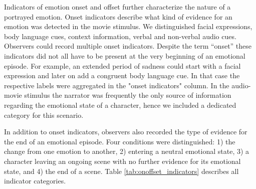 Indicators of emotion onset and offset further characterize the nature of a
portrayed emotion. Onset indicators describe what kind of evidence for an
emotion was detected in the movie stimulus. We distinguished facial
expressions, body language cues, context information, verbal and non-verbal
audio cues. Observers could record multiple onset indicators. Despite the term
``onset'' these indicators did not all have to be present at the very beginning
of an emotional episode. For example, an extended period of sadness could start
with a facial expression and later on add a congruent body language cue. In
that case the respective labels were aggregated in the "onset indicators"
column. In the audio-movie stimulus the narrator was frequently the only source
of information regarding the emotional state of a character, hence we included
a dedicated category for this scenario.

In addition to onset indicators, observers also recorded the type of evidence
for the end of an emotional episode. Four conditions were distinguished: 1) the
change from one emotion to another, 2) entering a neutral emotional state, 3) a
character leaving an ongoing scene with no further evidence for its emotional
state, and 4) the end of a scene.  Table \ref{tab:onoffset_indicators}
describes all indicator categories.

